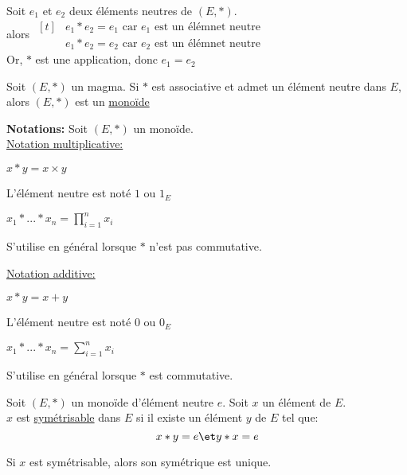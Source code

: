 \documentclass[12pt,twoside,a4paper]{article}
\begin{document}
		\begin{preuve}
			Soit $e_1$ et $e_2$ deux \'el\'ements neutres de $(E,*)$.\\
			alors $\begin{aligned}[t]
				& e_1*e_2=e_1\text{ car }e_1\text{ est un \'el\'emnet neutre}\\
				& e_1*e_2=e_2\text{ car }e_2\text{ est un \'el\'emnet neutre}
			\end{aligned}$\\
			Or, $*$ est une application, donc $e_1=e_2$
		\end{preuve}
		\begin{defi}
			Soit $(E,*)$ un magma. Si $*$ est associative et admet un \'el\'ement neutre dans $E$, alors $(E,*)$ est un \underline{mono\"ide}
		\end{defi}
		\begin{flushleft}
			\textbf{Notations:}
			Soit $(E,*)$ un mono\"ide.\\
			\underline{Notation multiplicative:}
			\begin{liste}
				\item $x*y=x\times y$
				\item L'\'el\'ement neutre est not\'e $1$ ou $1_E$
				\item $x_1*...*x_n=\prod\limits_{i=1}^{n}x_i$\\
				\item S'utilise en g\'en\'eral lorsque $*$ n'est pas commutative.
			\end{liste}
			\underline{Notation additive:}
			\begin{liste}
				\item $x*y=x+y$
				\item L'\'el\'ement neutre est not\'e $0$ ou $0_E$
				\item $x_1*...*x_n=\sum\limits_{i=1}^{n}x_i$\\
				\item S'utilise en g\'en\'eral lorsque $*$ est commutative.
			\end{liste}
		\end{flushleft}
		\begin{defi}
			Soit $(E,*)$ un mono\"ide d'\'el\'ement neutre $e$. Soit $x$ un \'el\'ement de $E$.\\
			$x$ est \underline{sym\'etrisable} dans $E$ si il existe un \'el\'ement $y$ de $E$ tel que:
			$$x*y=e\et y*x=e$$
		\end{defi}
		\begin{prop}
			Si $x$ est sym\'etrisable, alors son sym\'etrique est unique.
		\end{prop}
\end{document}
